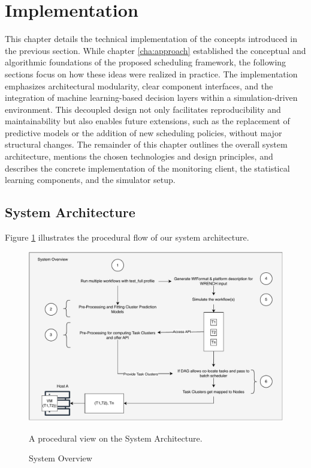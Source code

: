 \section{Implementation}
\label{cha:implementation}
This chapter details the technical implementation of the concepts introduced in the previous section. While chapter \ref{cha:approach} established the conceptual and algorithmic foundations of the proposed scheduling framework, the following sections focus on how these ideas were realized in practice. The implementation emphasizes architectural modularity, clear component interfaces, and the integration of machine learning-based decision layers within a simulation-driven environment. This decoupled design not only facilitates reproducibility and maintainability but also enables future extensions, such as the replacement of predictive models or the addition of new scheduling policies, without major structural changes. The remainder of this chapter outlines the overall system architecture, mentions the chosen technologies and design principles, and describes the concrete implementation of the monitoring client, the statistical learning components, and the simulator setup.

\subsection{System Architecture}
\label{sec:system_architecture}
Figure \ref{fig:05-system-overview} illustrates the procedural flow of our system architecture.

\label{sec:technology_and_design_choices}
\begin{figure}[H]
    \centering
    \includegraphics[scale=0.7]{fig/05/05-system-overview.pdf}
    \small
    \caption{System Overview}
    \label{fig:05-system-overview}
    \tiny
    A procedural view on the System Architecture.
\end{figure}

